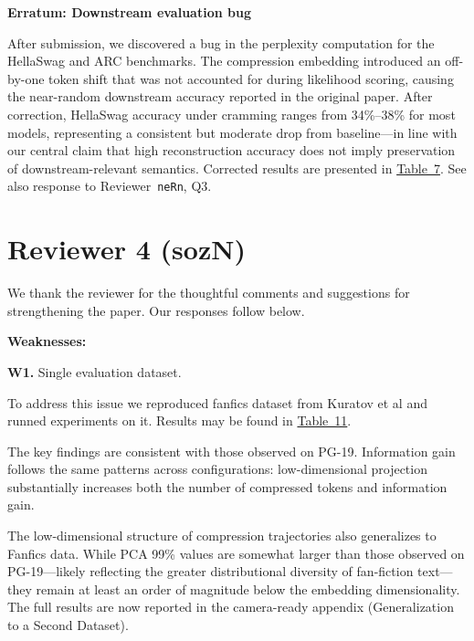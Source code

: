 
\textbf{Erratum: Downstream evaluation bug}

After submission, we discovered a bug in the perplexity computation for the HellaSwag and ARC benchmarks. The compression embedding introduced an off-by-one token shift that was not accounted for during likelihood scoring, causing the near-random downstream accuracy reported in the original paper. After correction, HellaSwag accuracy under cramming ranges from 34\%--38\% for most models, representing a consistent but moderate drop from baseline---in line with our central claim that high reconstruction accuracy does not imply preservation of downstream-relevant semantics. Corrected results are presented in \href{https://drive.google.com/file/d/1DIjiTpyIqQ4xuW0k9Q7mjCOFuXUPz2YX/view?usp=sharing}{Table~7}. See also response to Reviewer~\texttt{neRn}, Q3.


\section{Reviewer 4 (sozN)}

We thank the reviewer for the thoughtful comments and suggestions for strengthening the paper. Our responses follow below.

\textbf{Weaknesses:}

\textbf{W1.} Single evaluation dataset.

To address this issue we reproduced fanfics dataset from Kuratov et al and runned experiments on it. Results may be found in \href{https://drive.google.com/file/d/1iggPKMXXLJ_uL018BLOI3Ummv780ayF7/view?usp=sharing}{Table~11}.

The key findings are consistent with those observed on PG-19. Information gain follows the same patterns across configurations: low-dimensional projection substantially increases both the number of compressed tokens and information gain.

The low-dimensional structure of compression trajectories also generalizes to Fanfics data. While PCA 99\% values are somewhat larger than those observed on PG-19---likely reflecting the greater distributional diversity of fan-fiction text---they remain at least an order of magnitude below the embedding dimensionality. The full results are now reported in the camera-ready appendix (Generalization to a Second Dataset).


